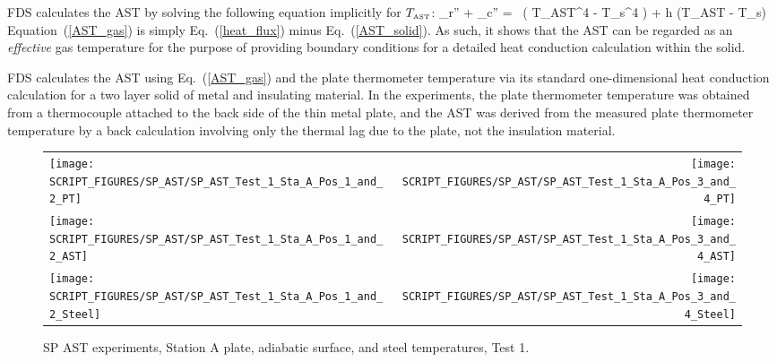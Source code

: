 FDS calculates the AST by solving the following equation implicitly for $T_{\hbox{\tiny AST}}$:
\be {}_r'' + _c'' = \epsilon \, \left( \sigma T_{\hbox{\tiny AST}}^4 - \sigma T_s^4 \right) + h (T_{\hbox{\tiny AST}} - T_s)  \label{AST_gas} \ee
Equation~(\ref{AST_gas}) is simply Eq.~(\ref{heat_flux}) minus Eq.~(\ref{AST_solid}). As such, it shows that the AST can be regarded as an {\em effective} gas temperature for
the purpose of providing boundary conditions for a detailed heat conduction calculation within the solid.

FDS calculates the AST using Eq.~(\ref{AST_gas}) and the plate thermometer temperature via its standard one-dimensional heat conduction calculation for a
two layer solid of metal and insulating material. In the experiments, the plate thermometer temperature was obtained from a thermocouple attached to the back side of
the thin metal plate, and the AST was derived from the measured plate thermometer temperature by a back calculation involving only the thermal lag due to the
plate, not the insulation material.

\newpage


\begin{figure}[p]
\begin{tabular*}{\textwidth}{l@{\extracolsep{\fill}}r}
\texttt{[image: SCRIPT\_FIGURES/SP\_AST/SP\_AST\_Test\_1\_Sta\_A\_Pos\_1\_and\_2\_PT]} &
\texttt{[image: SCRIPT\_FIGURES/SP\_AST/SP\_AST\_Test\_1\_Sta\_A\_Pos\_3\_and\_4\_PT]} \\
\texttt{[image: SCRIPT\_FIGURES/SP\_AST/SP\_AST\_Test\_1\_Sta\_A\_Pos\_1\_and\_2\_AST]} &
\texttt{[image: SCRIPT\_FIGURES/SP\_AST/SP\_AST\_Test\_1\_Sta\_A\_Pos\_3\_and\_4\_AST]} \\
\texttt{[image: SCRIPT\_FIGURES/SP\_AST/SP\_AST\_Test\_1\_Sta\_A\_Pos\_1\_and\_2\_Steel]} &
\texttt{[image: SCRIPT\_FIGURES/SP\_AST/SP\_AST\_Test\_1\_Sta\_A\_Pos\_3\_and\_4\_Steel]}
\end{tabular*}
\caption[SP AST experiments, Station A plate, adiabatic surface, and steel temperatures, Test 1]{SP AST experiments, Station A plate, adiabatic surface, and steel temperatures, Test 1.}
\label{SP_Test_1_Station_A}
\end{figure}

